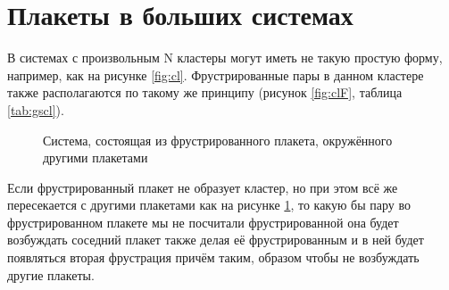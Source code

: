 \documentclass[utf8, babel, sor, jor, amsmath, amssymb, reprint]{elsarticle} %
\begin{document}
\section{Плакеты в больших системах}

В системах с произвольным N кластеры могут иметь не такую простую форму, например, как на рисунке \ref{fig:cl}. Фрустрированные пары в данном кластере также располагаются по такому же принципу (рисунок \ref{fig:clF}, таблица \ref{tab:gscl}).


\begin{figure}[H]
	\centering
	\caption{Система, состоящая из фрустрированного плакета, окружённого другими плакетами}
	\label{fig:4x4}
\end{figure}

Если фрустрированный плакет не образует кластер, но при этом всё же пересекается с другими плакетами как на рисунке \ref{fig:4x4}, то какую бы пару во фрустрированном плакете мы не посчитали фрустрированной она будет возбуждать соседний плакет также делая её фрустрированным и в ней будет появляться вторая фрустрация причём таким, образом чтобы не возбуждать другие плакеты. 
\end{document}
